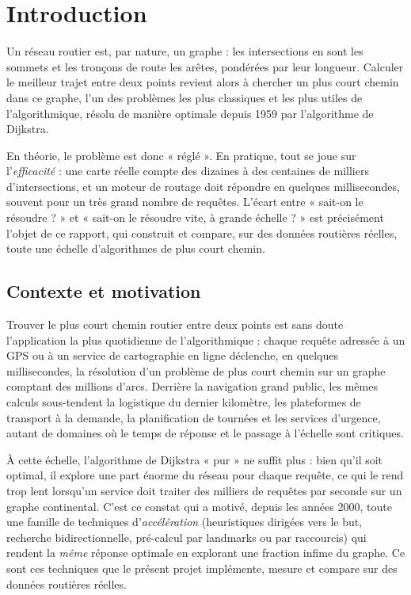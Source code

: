 \chapter{Introduction}
\label{ch:intro}

Un réseau routier est, par nature, un graphe : les intersections en sont les
sommets et les tronçons de route les arêtes, pondérées par leur longueur.
Calculer le meilleur trajet entre deux points revient alors à chercher un plus
court chemin dans ce graphe, l'un des problèmes les plus classiques et les plus
utiles de l'algorithmique, résolu de manière optimale depuis 1959 par
l'algorithme de Dijkstra.

\medskip

En théorie, le problème est donc « réglé ». En pratique, tout se joue sur
l'\emph{efficacité} : une carte réelle compte des dizaines à des centaines de
milliers d'intersections, et un moteur de routage doit répondre en quelques
millisecondes, souvent pour un très grand nombre de requêtes. L'écart entre
« sait-on le résoudre ? » et « sait-on le résoudre vite, à grande échelle ? » est
précisément l'objet de ce rapport, qui construit et compare, sur des données
routières réelles, toute une échelle d'algorithmes de plus court chemin.

\section{Contexte et motivation}

Trouver le plus court chemin routier entre deux points est sans doute
l'application la plus quotidienne de l'algorithmique : chaque requête adressée à
un GPS ou à un service de cartographie en ligne déclenche, en quelques
millisecondes, la résolution d'un problème de plus court chemin sur un graphe
comptant des millions d'arcs. Derrière la navigation grand public, les mêmes
calculs sous-tendent la logistique du dernier kilomètre, les plateformes de
transport à la demande, la planification de tournées et les services d'urgence, autant de domaines où le temps de réponse et le passage à l'échelle sont
critiques.

\medskip

À cette échelle, l'algorithme de Dijkstra « pur » ne suffit plus : bien qu'il
soit optimal, il explore une part énorme du réseau pour chaque requête, ce qui le
rend trop lent lorsqu'un service doit traiter des milliers de requêtes par seconde
sur un graphe continental. C'est ce constat qui a motivé, depuis les années 2000,
toute une famille de techniques d'\emph{accélération} (heuristiques dirigées
vers le but, recherche bidirectionnelle, pré-calcul par landmarks ou par
raccourcis) qui rendent la \emph{même} réponse optimale en explorant une
fraction infime du graphe. Ce sont ces techniques que le présent projet
implémente, mesure et compare sur des données routières réelles.


